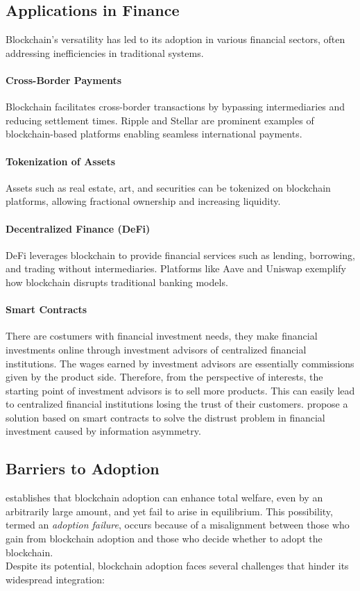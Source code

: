 \subsection{Applications in Finance}

Blockchain's versatility has led to its adoption in various financial sectors, often addressing inefficiencies in traditional systems.

\paragraph{Cross-Border Payments}
Blockchain facilitates cross-border transactions by bypassing intermediaries and reducing settlement times. Ripple and Stellar are prominent examples of blockchain-based platforms enabling seamless international payments.

\paragraph{Tokenization of Assets}
Assets such as real estate, art, and securities can be tokenized on blockchain platforms, allowing fractional ownership and increasing liquidity. 

\paragraph{Decentralized Finance (DeFi)}
DeFi leverages blockchain to provide financial services such as lending, borrowing, and trading without intermediaries. Platforms like Aave and Uniswap exemplify how blockchain disrupts traditional banking models.

\paragraph{Smart Contracts}
There are costumers with financial investment needs, they make financial investments online through investment advisors of centralized financial institutions. The wages earned by investment advisors are essentially commissions given by the product side. Therefore, from the perspective of interests, the starting point of investment advisors is to sell more products. This can easily lead to centralized financial institutions losing the trust of their customers.
 propose a solution based on smart contracts to  solve the distrust problem in financial investment caused by information asymmetry. 


\subsection{Barriers to Adoption}
 establishes that blockchain adoption can enhance total welfare, even by an arbitrarily large amount, and yet fail to arise in equilibrium. This possibility, termed an \textit{adoption failure}, occurs because of a misalignment between those who gain from blockchain adoption and those who decide whether to adopt the blockchain. \\
Despite its potential, blockchain adoption faces several challenges that hinder its widespread integration:

